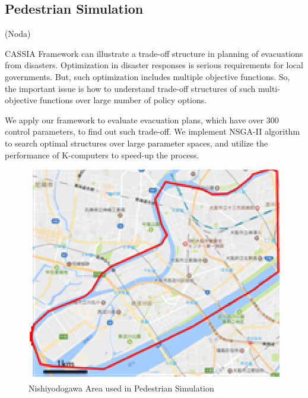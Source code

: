 \subsection{Pedestrian Simulation}
\label{ss:Pedestrian Simulation}
(Noda)

CASSIA Framework can illustrate a trade-off structure in planning of
evacuations from disasters.  Optimization in disaster responses is
serious requirements for local governments. But, such optimization
includes multiple objective functions.  So, the important issue is how
to understand trade-off structures of such multi-objective functions
over large number of policy options.

We apply our framework to evaluate evacuation plans, which have over
300 control parameters, to find out such trade-off.  We implement
NSGA-II algorithm to search optimal structures over large parameter
spaces, and utilize the performance of K-computers to speed-up the
process.

\begin{figure}
  \centering
  \includegraphics[width=.8\linewidth]{Figs.noda/figure-08.nishiyodogawa.eps}
  \caption{Nishiyodogawa Area used in Pedestrian Simulation}
  \label{fig:Figs.noda/figure-08.nishiyodogawa.eps}
\end{figure}

